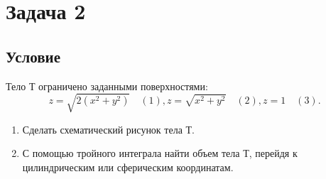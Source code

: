 \documentclass[12pt]{article}
\begin{document}
	\newpage

	\section*{Задача 2}	
	\subsection*{Условие}
	
	Тело $Т$ ограничено заданными поверхностями: $$z=\sqrt{2(x^2+y^2)}\quad(1), z=\sqrt{x^2+y^2}\quad(2), z=1\quad(3).$$
	
	\begin{enumerate}
		\item Сделать схематический рисунок тела $Т$.
		\item С помощью тройного интеграла найти объем тела $Т$, перейдя к цилиндрическим или сферическим координатам. 
	\end{enumerate}
	
\end{document}

